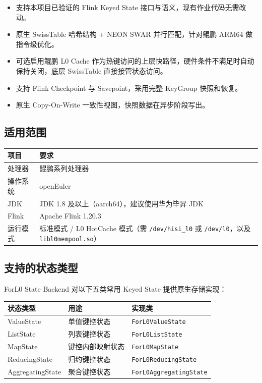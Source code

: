 \documentclass[a4paper,11pt]{article}
\newcommand{\project}{ForL0 State Backend}
\begin{document}
\begin{itemize}
  \item 支持本项目已验证的 Flink Keyed State 接口与语义，现有作业代码无需改动。
  \item 原生 SwissTable 哈希结构 + NEON SWAR 并行匹配，针对鲲鹏 ARM64 做指令级优化。
  \item 可选启用鲲鹏 L0 Cache 作为热键访问的上层快路径，硬件条件不满足时自动保持关闭，底层 SwissTable 直接接管状态访问。
  \item 支持 Flink Checkpoint 与 Savepoint，采用完整 KeyGroup 快照和恢复。
  \item 原生 Copy-On-Write 一致性视图，快照数据在异步阶段写出。
\end{itemize}

\subsection{适用范围}

\begin{table}[H]
\centering
\small
\begin{tabularx}{\textwidth}{L{3.2cm} X}
\toprule
\textbf{项目} & \textbf{要求} \\
\midrule
处理器 & 鲲鹏系列处理器 \\
操作系统 & openEuler \\
JDK & JDK 1.8 及以上（aarch64），建议使用华为毕昇 JDK \\
Flink & Apache Flink 1.20.3 \\
运行模式 & 标准模式 / L0 HotCache 模式（需 \texttt{/dev/hisi\_l0} 或 \texttt{/dev/l0}，以及 \texttt{libl0mempool.so}） \\
\bottomrule
\end{tabularx}
\end{table}

\subsection{支持的状态类型}

\project{} 对以下五类常用 Keyed State 提供原生存储实现：

\begin{table}[H]
\centering
\small
\begin{tabularx}{\textwidth}{L{3.2cm} X L{4.6cm}}
\toprule
\textbf{状态类型} & \textbf{用途} & \textbf{实现类} \\
\midrule
ValueState & 单值键控状态 & \texttt{ForL0ValueState} \\
ListState & 列表键控状态 & \texttt{ForL0ListState} \\
MapState & 键控内部映射状态 & \texttt{ForL0MapState} \\
ReducingState & 归约键控状态 & \texttt{ForL0ReducingState} \\
AggregatingState & 聚合键控状态 & \texttt{ForL0AggregatingState} \\
\bottomrule
\end{tabularx}
\end{table}
\end{document}

